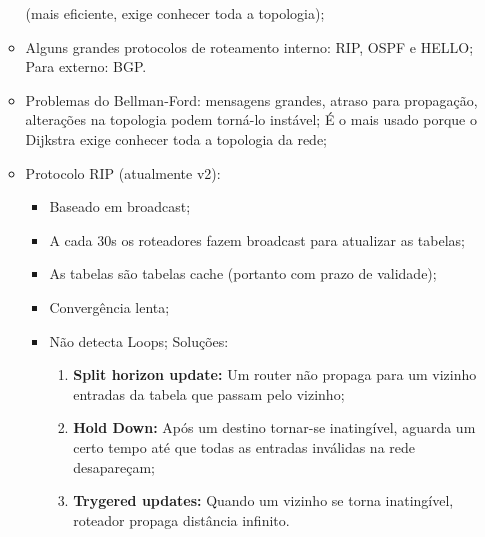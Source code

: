 \documentclass{article}
\begin{document}
\begin{itemize}
\begin{itemize}
(mais eficiente, exige conhecer toda a topologia);
         \item Alguns grandes protocolos de roteamento interno: RIP, OSPF e HELLO; Para externo:
BGP.
         \item Problemas do Bellman-Ford: mensagens grandes, atraso para propagação, alterações na
topologia podem torná-lo instável; É o mais usado porque o Dijkstra exige conhecer toda a topologia
da rede;
         \item Protocolo RIP (atualmente v2):
            \begin{itemize}
               \item Baseado em broadcast;
               \item A cada 30s os roteadores fazem broadcast para atualizar as tabelas;
               \item As tabelas são tabelas cache (portanto com prazo de validade);
               \item Convergência lenta;
               \item Não detecta Loops; Soluções:
                  \begin{enumerate}
                     \item \textbf{Split horizon update:} Um router não propaga para um vizinho
entradas da tabela que passam pelo vizinho;
                     \item \textbf{Hold Down:} Após um destino tornar-se inatingível, aguarda um certo tempo
até que todas as entradas inválidas na rede desapareçam;
                     \item \textbf{Trygered updates:} Quando um vizinho se torna inatingível, roteador
propaga distância infinito.
                  \end{enumerate}
            \end{itemize}
      \end{itemize}
\end{itemize}
\end{document}
